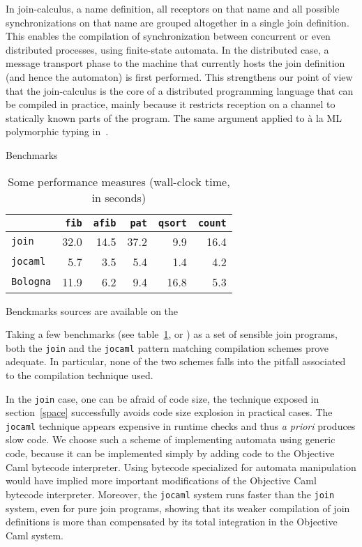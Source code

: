 In join-calculus, a name definition, all receptors on that name and all
possible synchronizations on that name are grouped altogether in a single
join definition. This enables the compilation of synchronization
between concurrent or even distributed processes, using finite-state
automata.
In the distributed case, a message transport phase to the
machine that currently hosts the join definition (and hence the
automaton) is first performed.  This strengthens our point of view
that the join-calculus is the core of a distributed programming
language that can be compiled in practice, mainly because it restricts
reception on a channel to statically known parts of the program.  The
same argument applied to \`a la ML polymorphic typing
in~\cite{join-typing-97}.

\begin{cutflow}{Benchmarks}
\begin{table}[ht]
\begin{center}
\begin{tabular}{l@{\quad}r@{\quad}r@{\quad}r@{\quad}r@{\quad}r}
& \texttt{fib} &
\texttt{afib} &
\texttt{pat} &
\texttt{qsort} &
\texttt{count}\\ \hline
\texttt{join} &  32.0 & 14.5 & 37.2 & 9.9 & 16.4 \\
\texttt{jocaml} & 5.7 &  3.5 & 5.4 & 1.4 & 4.2 \\
\texttt{Bologna} & 11.9 & 6.2 &  9.4 & 16.8 & 5.3 \\
\end{tabular}
\end{center}
\caption{\label{perf}Some performance measures (wall-clock time, in seconds)}
\end{table}
Benckmarks sources are available on the 
\end{cutflow}
Taking a few benchmarks (see table~\ref{perf}, or )
as a set of sensible join programs, both the
{\tt join} and the {\tt jocaml} pattern matching compilation schemes
prove adequate.  In particular, none of the two schemes falls into the
pitfall associated to the compilation technique used.

In the {\tt join} case, one can be afraid of code size, the technique
exposed in section~\ref{space} successfully avoids code size explosion
in practical cases.  The {\tt jocaml} technique appears expensive in
runtime checks and thus {\em a priori} produces slow code.  We choose
such a scheme of implementing automata using generic code, because it
can be implemented simply by adding code to the Objective Caml
bytecode interpreter.  Using bytecode specialized for automata
manipulation would have implied more important modifications of the
Objective Caml bytecode interpreter. Moreover, the {\tt jocaml} system
runs faster than the {\tt join} system, even for pure join programs,
showing that its weaker compilation of join definitions is more than
compensated by its total integration in the Objective Caml system.

